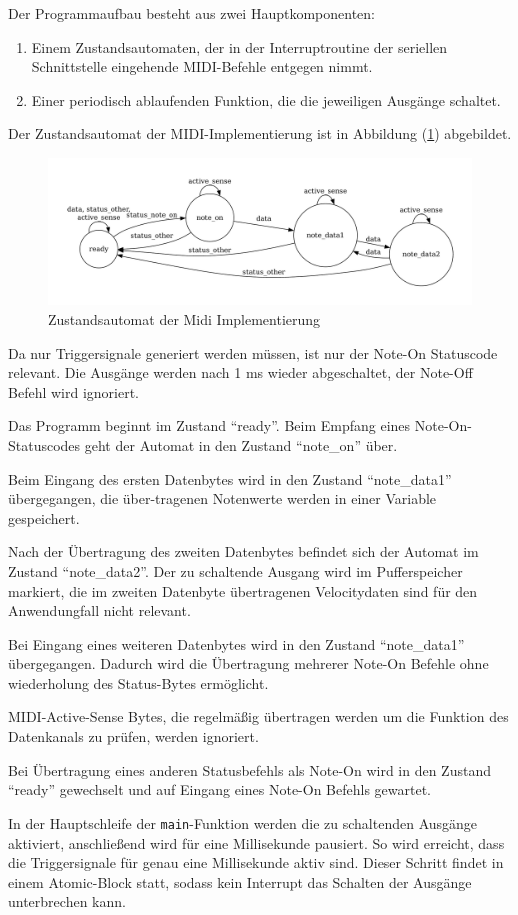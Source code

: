 Der Programmaufbau besteht aus zwei Hauptkomponenten: 
\begin{enumerate}
    \item Einem Zustandsautomaten, der in der Interruptroutine der seriellen Schnittstelle eingehende MIDI-Befehle entgegen nimmt.
    \item Einer periodisch ablaufenden Funktion, die die jeweiligen Ausgänge schaltet.
\end{enumerate}

Der Zustandsautomat der MIDI-Implementierung ist in Abbildung (\ref{fig:sm}) abgebildet.

\begin{figure}[h]
    \centering
    \includegraphics[width=0.9 \linewidth]{Images/sm.pdf}
    \caption{Zustandsautomat der Midi Implementierung}
    \label{fig:sm}
\end{figure}

Da nur Triggersignale generiert werden müssen, ist nur der Note-On Statuscode relevant. Die Ausgänge werden nach 1 ms wieder abgeschaltet, der Note-Off Befehl wird ignoriert.

Das Programm beginnt im Zustand \enquote{ready}.
Beim Empfang eines Note-On-Statuscodes geht der Automat in den Zustand \enquote{note\_on} über.

Beim Eingang des ersten Datenbytes wird in den Zustand \enquote{note\_data1} übergegangen, die über-tragenen Notenwerte werden in einer Variable gespeichert.

Nach der Übertragung des zweiten Datenbytes befindet sich der Automat im Zustand \enquote{note\_data2}.
Der zu schaltende Ausgang wird im Pufferspeicher markiert, die im zweiten Datenbyte übertragenen Velocitydaten sind für den Anwendungfall nicht relevant.

Bei Eingang eines weiteren Datenbytes wird in den Zustand \enquote{note\_data1} übergegangen. Dadurch wird die Übertragung mehrerer Note-On Befehle ohne wiederholung des Status-Bytes ermöglicht.

MIDI-Active-Sense Bytes, die regelmäßig übertragen werden um die Funktion des Datenkanals zu prüfen, werden ignoriert.

Bei Übertragung eines anderen Statusbefehls als Note-On wird in den Zustand \enquote{ready} gewechselt und auf Eingang eines Note-On Befehls gewartet.

In der Hauptschleife der \texttt{main}-Funktion werden die zu schaltenden Ausgänge aktiviert, anschließend wird für eine Millisekunde pausiert. So wird erreicht, dass die Triggersignale für genau eine Millisekunde aktiv sind. 
Dieser Schritt findet in einem Atomic-Block statt, sodass kein Interrupt das Schalten der Ausgänge unterbrechen kann.




